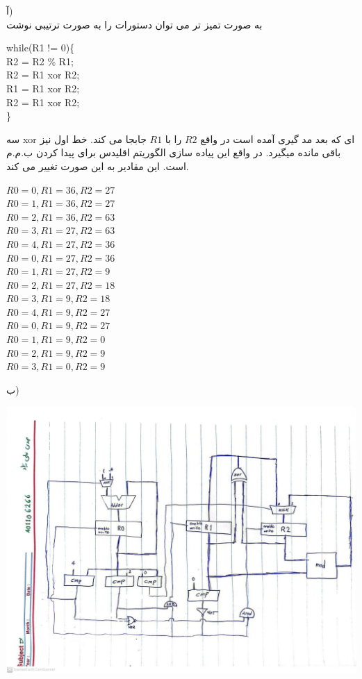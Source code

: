آ)\\
به صورت تمیز تر می توان دستورات را به صورت ترتیبی نوشت\\
\begin{latin}
while(R1 != 0)\{\\
\quad R2 = R2 \% R1;\\
\quad R2 = R1 xor R2;\\
\quad R1 = R1 xor R2;\\
\quad R2 = R1 xor R2;\\
\}\\
\end{latin}
سه 
xor
ای که بعد مد گیری آمده است در واقع 
$R2$
را با
$R1$
جابجا می کند.
خط اول نیز باقی مانده میگیرد.
در واقع این پیاده سازی الگوریتم اقلیدس برای پیدا کردن ب.م.م است.
این مقادیر به این صورت تغییر می کند.\\
\begin{latin}
$R0 = 0, R1 = 36, R2 = 27$\\
$R0 = 1, R1 = 36, R2 = 27$\\
$R0 = 2, R1 = 36, R2 = 63$\\
$R0 = 3, R1 = 27, R2 = 63$\\
$R0 = 4, R1 = 27, R2 = 36$\\
$R0 = 0, R1 = 27, R2 = 36$\\
$R0 = 1, R1 = 27, R2 = 9$\\
$R0 = 2, R1 = 27, R2 = 18$\\
$R0 = 3, R1 = 9, R2 = 18$\\
$R0 = 4, R1 = 9, R2 = 27$\\
$R0 = 0, R1 = 9, R2 = 27$\\
$R0 = 1, R1 = 9, R2 = 0$\\
$R0 = 2, R1 = 9, R2 = 9$\\
$R0 = 3, R1 = 0, R2 = 9$\\
\end{latin}
ب)
\begin{center}
    
\includegraphics[width=\textwidth]{images/shematic2.png}
\end{center}